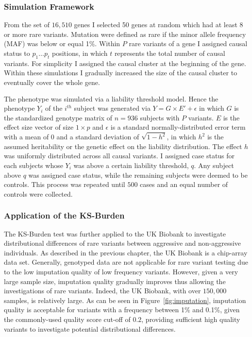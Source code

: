 \subsubsection{Simulation Framework}
\label{ssub:Simulation_Framework}
From the set of $16,510$ genes I selected 50 genes at random which had at least 8 or more rare variants. 
Mutation were defined as rare if the minor allele frequency (MAF) was below or equal 1\%. 
Within $P$ rare variants of a gene I assigned causal status to $p_1 \ldots p_t$ positions, in which $t$ represents the total number of causal variants.
For simplicity I assigned the causal cluster at the beginning of the gene.
Within these simulations I gradually increased the size of the causal cluster to eventually cover the whole gene. 

The phenotype was simulated via a liability threshold model.
Hence the phenotype $Y_i$ of the $i^{th}$ subject was generated via
$Y = G\times E' + \epsilon$
in which $G$ is the standardized genotype matrix of $n=936$ subjects with $P$ variants.
$E$ is the effect size vector of size $1\times p$ and $\epsilon$ is a standard normally-distributed error term with a mean of $0$ and a standard deviation of $\sqrt{1-h^2}$, in which $h^2$ is the assumed heritability or the genetic effect on the liability distribution.
The effect $h$ was uniformly distributed across all causal variants.
I assigned case status for each subjects whose $Y_i$ was above a certain liability threshold, $q$.
Any subject above $q$ was assigned case status, while the remaining subjects were deemed to be controls.
This process was repeated until $500$ cases and an equal number of controls were collected.

\subsubsection{Application of the KS-Burden}
\label{ssub:Application_of_the_KS-Burden}
The KS-Burden test was further applied to the UK Biobank to investigate distributional differences of rare variants between aggressive and non-aggressive individuals.
As described in the previous chapter, the UK Biobank is a chip-array data set.
Generally, genotyped data are not applicable for rare variant testing due to the low imputation quality of low frequency variants.
However, given a very large sample size, imputation quality  gradually improves thus allowing the investigations of rare variants.
Indeed, the UK Biobank, with over $150,000$ samples, is relatively large.
As can be seen in Figure~\ref{fig:imputation}, imputation quality is acceptable for variants with a frequency between 1\% and 0.1\%, given the commonly-used quality score cut-off of $0.2$,
providing sufficient high quality variants to investigate potential distributional differences.


